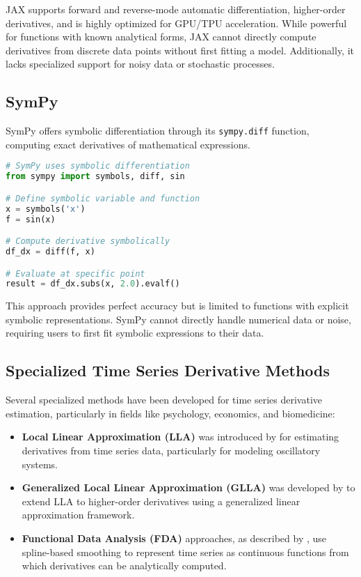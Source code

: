 \documentclass[11pt,a4paper]{article}
\begin{document}
JAX supports forward and reverse-mode automatic differentiation, higher-order derivatives, and is highly optimized for GPU/TPU acceleration. While powerful for functions with known analytical forms, JAX cannot directly compute derivatives from discrete data points without first fitting a model. Additionally, it lacks specialized support for noisy data or stochastic processes.

\subsection{SymPy}

SymPy \citep{sympy2017} offers symbolic differentiation through its \texttt{sympy.diff} function, computing exact derivatives of mathematical expressions.

\begin{lstlisting}[language=Python, caption=SymPy symbolic differentiation example]
# SymPy uses symbolic differentiation
from sympy import symbols, diff, sin

# Define symbolic variable and function
x = symbols('x')
f = sin(x)

# Compute derivative symbolically
df_dx = diff(f, x)

# Evaluate at specific point
result = df_dx.subs(x, 2.0).evalf()
\end{lstlisting}

This approach provides perfect accuracy but is limited to functions with explicit symbolic representations. SymPy cannot directly handle numerical data or noise, requiring users to first fit symbolic expressions to their data.

\subsection{Specialized Time Series Derivative Methods}

Several specialized methods have been developed for time series derivative estimation, particularly in fields like psychology, economics, and biomedicine:

\begin{itemize}
    \item \textbf{Local Linear Approximation (LLA)} was introduced by \citet{boker2002method} for estimating derivatives from time series data, particularly for modeling oscillatory systems.
    
    \item \textbf{Generalized Local Linear Approximation (GLLA)} was developed by \citet{boker2010generalized} to extend LLA to higher-order derivatives using a generalized linear approximation framework.
    
    \item \textbf{Functional Data Analysis (FDA)} approaches, as described by \citet{ramsay2005functional}, use spline-based smoothing to represent time series as continuous functions from which derivatives can be analytically computed.
\end{itemize}
\end{document}

